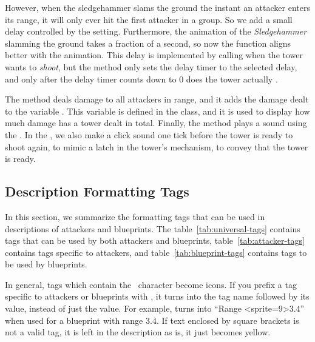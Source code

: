 However, when the sledgehammer slams the ground the instant an attacker enters its range, it will only ever hit the first attacker in a group.
So we add a small delay controlled by the  setting.
Furthermore, the animation of the \emph{Sledgehammer} slamming the ground takes a fraction of a second, so now the function aligns better with the animation.
This delay is implemented by calling  when the tower wants to \emph{shoot}, but the method only sets the delay timer to the selected delay, and only after the delay timer counts down to 0 does the tower actually .

The method  deals damage to all attackers in range, and it adds the damage dealt to the variable .
This variable is defined in the  class, and it is used to display how much damage has a tower dealt in total.
Finally, the method plays a sound using the .
In the , we also make a click sound one tick before the tower is ready to shoot again, to mimic a latch in the tower's mechanism, to convey that the tower is ready.

\subsection{Description Formatting Tags}\label{sec:docs-format-tags}

In this section, we summarize the formatting tags that can be used in descriptions of attackers and blueprints.
The table~\ref{tab:universal-tags} contains tags that can be used by both attackers and blueprints, table~\ref{tab:attacker-tags} contains tags specific to attackers, and table~\ref{tab:blueprint-tags} contains tags to be used by blueprints.

In general, tags which contain the \mono{\#}~character become icons.
If you prefix a tag specific to attackers or blueprints with \mono{\$}, it turns into the tag name followed by its value, instead of just the value.
For example, \mono{[\$RNG]} turns into \enquote{Range <sprite=9>$3.4$} when used for a blueprint with range $3.4$.
If text enclosed by square brackets is not a valid tag, it is left in the description as is, it just becomes yellow.

